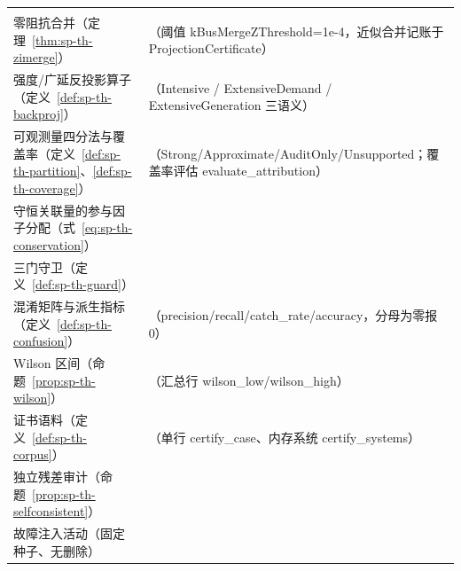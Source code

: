 \begin{center}
\begin{longtable}{@{}L{6.8cm}L{8.6cm}@{}}
\\
零阻抗合并（定理~\ref{thm:sp-th-zimerge}） &
（阈值 kBusMergeZThreshold=1e-4，近似合并记账于 ProjectionCertificate）\\
强度/广延反投影算子（定义~\ref{def:sp-th-backproj}） &
（Intensive / ExtensiveDemand / ExtensiveGeneration 三语义）\\
可观测量四分法与覆盖率（定义~\ref{def:sp-th-partition}、\ref{def:sp-th-coverage}） &
（Strong/Approximate/AuditOnly/Unsupported；覆盖率评估 evaluate\_attribution）\\
守恒关联量的参与因子分配（式~\eqref{eq:sp-th-conservation}） &
\\
三门守卫（定义~\ref{def:sp-th-guard}） &
\\
混淆矩阵与派生指标（定义~\ref{def:sp-th-confusion}） &
（precision/recall/catch\_rate/accuracy，分母为零报 0）\\
Wilson 区间（命题~\ref{prop:sp-th-wilson}） &
（汇总行 wilson\_low/wilson\_high）\\
证书语料（定义~\ref{def:sp-th-corpus}） &
（单行 certify\_case、内存系统 certify\_systems）\\
独立残差审计（命题~\ref{prop:sp-th-selfconsistent}） &
\\
故障注入活动（固定种子、无删除） &
\\
\bottomrule
\end{longtable}
\end{center}

